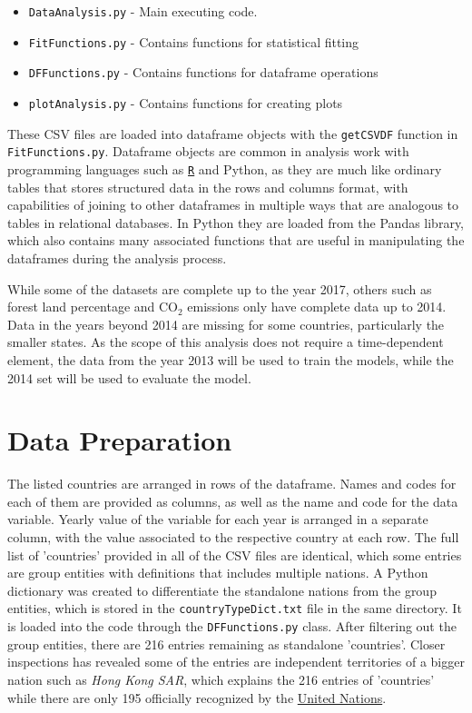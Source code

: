 \documentclass[11pt,a4paper,titlepage]{article}
\newcommand{\blankline}{\quad\pagebreak[2]}
\begin{document}
\begin{itemize}
    \item \texttt{DataAnalysis.py} - Main executing code.
    \item \texttt{FitFunctions.py} - Contains functions for statistical fitting
    \item \texttt{DFFunctions.py} - Contains functions for dataframe operations
    \item \texttt{plotAnalysis.py} - Contains functions for creating plots
\end{itemize}

These CSV files are loaded into dataframe objects with the \texttt{getCSVDF} function in \texttt{FitFunctions.py}. Dataframe objects are common in analysis work with programming languages such as \href{https://www.r-project.org/}{\texttt{R}} and Python, as they are much like ordinary tables that stores structured data in the rows and columns format, with capabilities of joining to other dataframes in multiple ways that are analogous to tables in relational databases. In Python they are loaded from the Pandas library, which also contains many associated functions that are useful in manipulating the dataframes during the analysis process. 

\blankline

While some of the datasets are complete up to the year 2017, others such as forest land percentage and CO$_{2}$ emissions only have complete data up to 2014. Data in the years beyond 2014 are missing for some countries, particularly the smaller states. As the scope of this analysis does not require a time-dependent element, the data from the year 2013 will be used to train the models, while the 2014 set will be used to evaluate the model.

\section{Data Preparation}

The listed countries are arranged in rows of the dataframe. Names and codes for each of them are provided as columns, as well as the name and code for the data variable. Yearly value of the variable for each year is arranged in a separate column, with the value associated to the respective country at each row. The full list of 'countries' provided in all of the CSV files are identical, which some entries are group entities with definitions that includes multiple nations. A Python dictionary was created to differentiate the standalone nations from the group entities, which is stored in the \texttt{countryTypeDict.txt} file in the same directory. It is loaded into the code through the \texttt{DFFunctions.py} class. After filtering out the group entities, there are 216 entries remaining as standalone 'countries'. Closer inspections has revealed some of the entries are independent territories of a bigger nation such as \textit{Hong Kong SAR}, which explains the 216 entries of 'countries' while there are only 195 officially recognized by the \href{http://www.un.org/en/index.html}{United Nations}.
\end{document}
